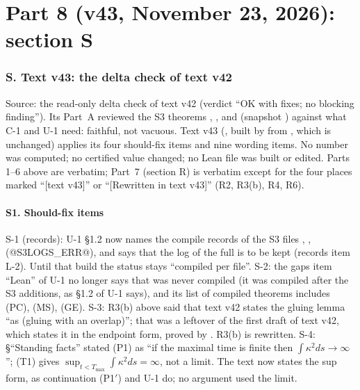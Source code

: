 \part*{Part 8 (v43, November 23, 2026): section S}
\section*{S. Text v43: the delta check of text v42}
Source: the read-only delta check  of text v42 (verdict ``OK with fixes; no blocking finding''). Its Part~A reviewed the S3 theorems , ,  and  (snapshot ) against what C-1 and U-1 need: faithful, not vacuous. Text v43 (, built by  from , which is unchanged) applies its four should-fix items and nine wording items. No number was computed; no certified value changed; no Lean file was built or edited. Parts 1--6 above are verbatim; Part~7 (section R) is verbatim except for the four places marked ``[text v43]'' or ``[Rewritten in text v43]'' (R2, R3(b), R4, R6).
\subsection*{S1. Should-fix items}
S-1 (records): U-1 \S1.2 now names the compile records of the S3 files , ,  (@S3LOGS_ERR@), and says that the log of the full  is to be kept (records item L-2). Until that build the status stays ``compiled per file''. S-2: the gaps item ``Lean'' of U-1 no longer says that  was never compiled (it was compiled after the S3 additions, as \S1.2 of U-1 says), and its list of compiled theorems includes (PC), (MS), (GE). S-3: R3(b) above said that text v42 states the gluing lemma ``as  (gluing with an overlap)''; that was a leftover of the first draft of text v42, which states it in the endpoint form, proved by . R3(b) is rewritten. S-4:  \S``Standing facts'' stated (P1) as ``if the maximal time is finite then $\int\kappa^2ds\to\infty$''; (T1) gives $\sup_{t<T_{\max}}\int\kappa^2ds=\infty$, not a limit. The text now states the sup form, as continuation (P1$'$) and U-1 do; no argument used the limit.

